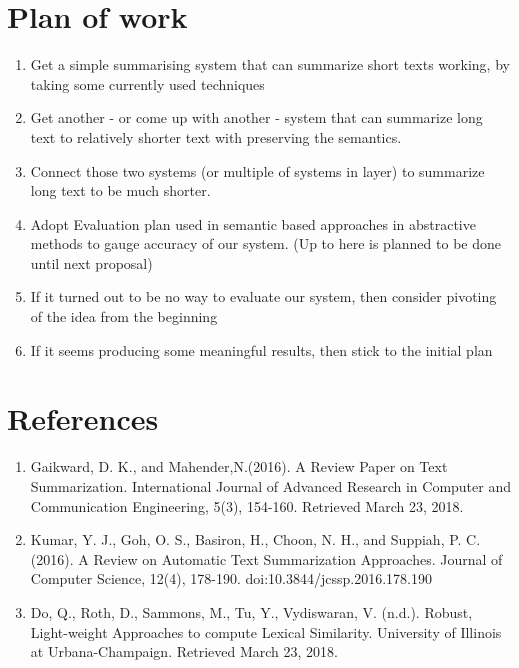 \section{Plan of work}

\begin{enumerate}
  \item Get a simple summarising system that can summarize short texts working, by taking some currently used techniques
  \item Get another - or come up with another - system that can summarize long text to relatively shorter text with preserving the semantics.
  \item Connect those two systems (or multiple of systems in layer) to summarize long text to be much shorter.
  \item Adopt Evaluation plan used in semantic based approaches in abstractive methods to gauge accuracy of our system. (Up to here is planned to be done until next proposal)
  \item If it turned out to be no way to evaluate our system, then consider pivoting of the idea from the beginning
  \item If it seems producing some meaningful results, then stick to the initial plan
\end{enumerate}

\section{References}
\begin{enumerate}
	\item Gaikward, D. K., and Mahender,N.(2016). A Review Paper on Text Summarization. International Journal of Advanced Research in Computer and Communication Engineering, 5(3), 154-160. Retrieved March 23, 2018.
	\item Kumar, Y. J., Goh, O. S., Basiron, H., Choon, N. H., and Suppiah, P. C. (2016). A Review on Automatic Text Summarization Approaches. Journal of Computer Science, 12(4), 178-190. doi:10.3844/jcssp.2016.178.190
	\item Do, Q., Roth, D., Sammons, M., Tu, Y., Vydiswaran, V. (n.d.). Robust, Light-weight Approaches to compute Lexical Similarity. University of Illinois at Urbana-Champaign. Retrieved March 23, 2018.
	
\end{enumerate}
